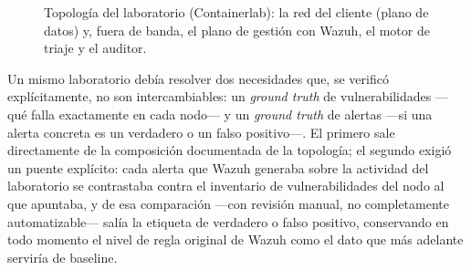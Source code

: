 \begin{figure}[htbp]
\centering
\shorthandoff{>}%
\shorthandon{>}%
\caption[Topología del laboratorio]{Topología del laboratorio (Containerlab): la red del cliente
(plano de datos) y, fuera de banda, el plano de gestión con Wazuh, el motor de triaje y el auditor.}
\label{fig:topologia}
\end{figure}

Un mismo laboratorio debía resolver dos necesidades que, se verificó explícitamente, no son
intercambiables: un \emph{ground truth} de vulnerabilidades ---qué falla exactamente en cada
nodo--- y un \emph{ground truth} de alertas ---si una alerta concreta es un verdadero o un falso
positivo---. El primero sale directamente de la composición documentada de la topología; el segundo
exigió un puente explícito: cada alerta que Wazuh generaba sobre la actividad del laboratorio se
contrastaba contra el inventario de vulnerabilidades del nodo al que apuntaba, y de esa
comparación ---con revisión manual, no completamente automatizable--- salía la etiqueta de verdadero o
falso positivo, conservando en todo momento el nivel de regla original de Wazuh como el dato que
más adelante serviría de baseline.


